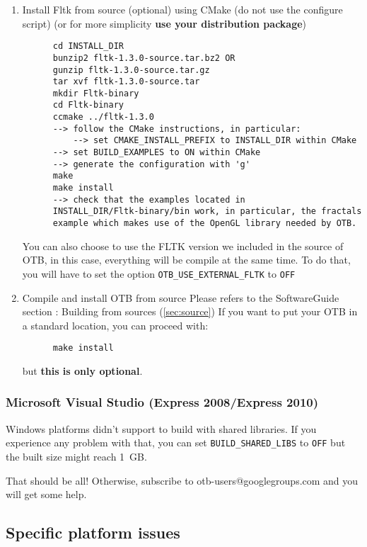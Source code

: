 \begin{enumerate}
\item Install Fltk from source (optional) using CMake (do not use the configure script) (or for more simplicity \textbf{use your distribution package})
  \begin{verbatim}
      cd INSTALL_DIR
      bunzip2 fltk-1.3.0-source.tar.bz2 OR
      gunzip fltk-1.3.0-source.tar.gz
      tar xvf fltk-1.3.0-source.tar
      mkdir Fltk-binary
      cd Fltk-binary
      ccmake ../fltk-1.3.0
      --> follow the CMake instructions, in particular:
          --> set CMAKE_INSTALL_PREFIX to INSTALL_DIR within CMake
	  --> set BUILD_EXAMPLES to ON within CMake
	  --> generate the configuration with 'g'
      make
      make install
      --> check that the examples located in
      INSTALL_DIR/Fltk-binary/bin work, in particular, the fractals
      example which makes use of the OpenGL library needed by OTB.
  \end{verbatim}

   You can also choose to use the FLTK version we included in the source of OTB, in this case, everything will be compile at the same time. To do that, you will have to set the option \texttt{OTB\_USE\_EXTERNAL\_FLTK} to \texttt{OFF}

\item Compile and install OTB from source
  Please refers to the SoftwareGuide section : Building from sources (\ref{sec:source})
  If you want to put your OTB in a standard location, you can proceed with:

  \begin{verbatim}
      make install
  \end{verbatim}

  but \textbf{this is only optional}.


\end{enumerate}

\subsubsection{Microsoft Visual Studio (Express 2008/Express 2010)}
Windows platforms didn't support to build with shared libraries. If you experience any problem
with that, you can set \texttt{BUILD\_SHARED\_LIBS} to \texttt{OFF} but the
built size might reach 1~GB.

That should be all! Otherwise, subscribe to
   otb-users@googlegroups.com and you will get some help.

\subsection{Specific platform issues}
%

